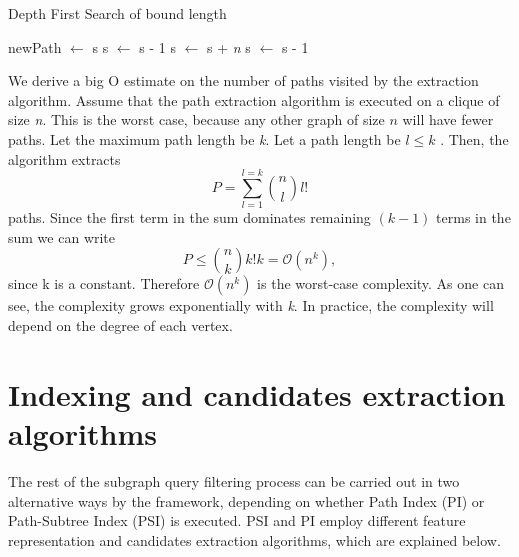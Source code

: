 \documentclass{l4proj}
\begin{document}
\begin{algorithm}
\centering
\caption{Depth First Search of bound length}
\label{alg:dfsBounded}
\begin{algorithmic}[1]
\State newPath  $\gets$ s  
\State {}
\EndIf
{}
\State s $\gets$ s - 1 
\EndIf
{}
\State s $\gets$ s + \emph{n}
\State {} 
\EndIf
\EndFor
{} 
\State  s $\gets$ s - 1
\EndIf
\EndProcedure
\end{algorithmic}
\end{algorithm}

We derive a big O estimate on the number of paths visited by the extraction algorithm. Assume that the path extraction algorithm is executed on a clique of size \emph{n}. This is the worst case, because any other graph of size $n$ will have fewer paths. Let the maximum path length be \emph{k}. Let a path length be $l \leq k$ . Then, the algorithm extracts $$P=\sum _{l=1} ^{l=k} \binom {n} {l}l!$$ paths. Since the first term in the sum dominates remaining $(k-1)$ terms in the sum we can write $$P \leq \binom {n} {k}k!k = \mathcal{O}(n^k),$$ since k is a constant. Therefore $\mathcal{O}(n^{k})$ is the worst-case complexity. As one can see, the complexity grows exponentially with \emph{k}. In practice, the complexity will depend on the degree of each vertex.

\section{Indexing and candidates extraction algorithms}
\label{sec:PIandPSI}
The rest of the subgraph query filtering process can be carried out in two alternative ways by the framework, depending on whether Path Index (PI) or Path-Subtree Index (PSI) is executed. PSI and PI employ different feature representation and candidates extraction algorithms, which are explained below.
\end{document}
